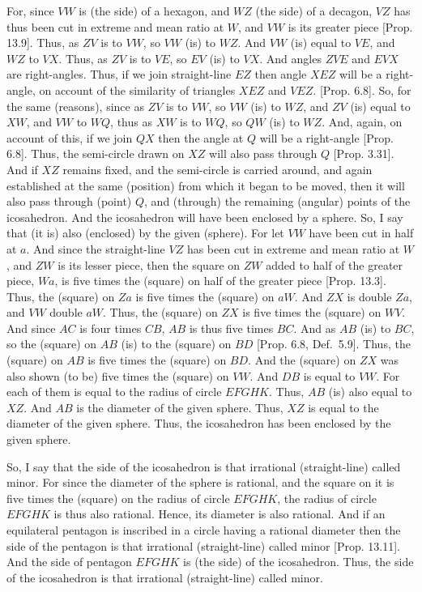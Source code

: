 \begin{Parallel}{}{}
{For, since $VW$ is (the side) of a hexagon, and $WZ$ (the side) of
a decagon, $VZ$ has thus been cut in extreme and mean
ratio at $W$, and $VW$ is its greater piece  [Prop. 13.9]. Thus, as
$ZV$ is to $VW$, so $VW$ (is) to $WZ$. And $VW$ (is) equal
to $VE$, and $WZ$ to $VX$.  Thus, as $ZV$ is to $VE$,
so $EV$ (is) to $VX$. And angles $ZVE$ and
$EVX$ are right-angles. Thus, if we join straight-line $EZ$ then angle
$XEZ$ will be a right-angle, on account of the similarity of triangles
$XEZ$ and $VEZ$.  [Prop. 6.8]. So, for the same (reasons), since
as $ZV$ is to $VW$, so $VW$ (is) to $WZ$,  and $ZV$ (is) equal to
$XW$, and $VW$ to $WQ$, thus as $XW$ is to $WQ$, so $QW$
(is) to $WZ$. And, again, on account of this,  if we join $QX$ then the
angle at $Q$ will be a right-angle [Prop. 6.8]. Thus, the semi-circle
drawn on $XZ$ will also pass through $Q$ [Prop. 3.31]. And if $XZ$ remains
fixed, and the semi-circle is carried around, and again established at
the same (position) from which it began to be moved, then it will
also pass through (point) $Q$, and (through) the remaining (angular) points
of the icosahedron. And the icosahedron will have been enclosed by a sphere.
 So, I say that (it is) also (enclosed) by the given (sphere). 
 For let $VW$ have been cut in half at $a$. And since the straight-line $VZ$ has been cut in extreme and mean ratio at $W$, and  $ZW$ is its lesser piece,
 then the square on $ZW$ added to half of the greater piece, $Wa$, is
 five times the (square) on half of the greater piece [Prop. 13.3]. 
 Thus, the (square) on $Za$ is five times the (square) on $aW$. And
 $ZX$ is double $Za$, and $VW$ double $aW$. Thus,
 the (square) on $ZX$ is five times the (square) on $WV$. And since
 $AC$ is four times $CB$, $AB$ is thus five times $BC$. And as
 $AB$ (is) to $BC$, so the (square) on $AB$ (is) to the
 (square) on $BD$ [Prop. 6.8, Def.~5.9]. Thus, the (square)
 on $AB$ is five times the (square) on $BD$. And the (square) on 
 $ZX$ was also shown (to be) five times the (square) on $VW$. 
 And $DB$ is equal to $VW$. For each of them is equal to the
 radius of circle $EFGHK$.  Thus, $AB$ (is) also equal to
 $XZ$.  And $AB$ is the diameter of the given sphere. Thus,
 $XZ$ is equal to the diameter of the given sphere. Thus, the icosahedron
 has been enclosed by the given sphere.
 
 So, I say that the side of the icosahedron is that irrational (straight-line)
 called minor. For since the diameter of the sphere is rational, and the
 square on it is five times the (square) on the radius of circle
 $EFGHK$, the radius of circle $EFGHK$ is thus also rational.
 Hence, its diameter is also rational. And if an equilateral
 pentagon is inscribed in a circle having a rational diameter then
 the side of the pentagon is that irrational (straight-line) called minor [Prop. 13.11]. And the side of pentagon $EFGHK$ is (the side)
 of the icosahedron. Thus, the side of the icosahedron is that irrational
 (straight-line) called minor.}
\end{Parallel}

